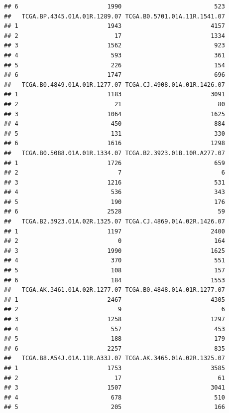 \documentclass[
]{article}
\begin{document}
\begin{verbatim}
## 6                         1990                          523
##   TCGA.BP.4345.01A.01R.1289.07 TCGA.B0.5701.01A.11R.1541.07
## 1                         1943                         4157
## 2                           17                         1334
## 3                         1562                          923
## 4                          593                          361
## 5                          226                          154
## 6                         1747                          696
##   TCGA.B0.4849.01A.01R.1277.07 TCGA.CJ.4908.01A.01R.1426.07
## 1                         1183                         3091
## 2                           21                           80
## 3                         1064                         1625
## 4                          450                          884
## 5                          131                          330
## 6                         1616                         1298
##   TCGA.B0.5088.01A.01R.1334.07 TCGA.B2.3923.01B.10R.A277.07
## 1                         1726                          659
## 2                            7                            6
## 3                         1216                          531
## 4                          536                          343
## 5                          190                          176
## 6                         2528                           59
##   TCGA.B2.3923.01A.02R.1325.07 TCGA.CJ.4869.01A.02R.1426.07
## 1                         1197                         2400
## 2                            0                          164
## 3                         1990                         1625
## 4                          370                          551
## 5                          108                          157
## 6                          184                         1553
##   TCGA.AK.3461.01A.02R.1277.07 TCGA.B0.4848.01A.01R.1277.07
## 1                         2467                         4305
## 2                            9                            6
## 3                         1258                         1297
## 4                          557                          453
## 5                          188                          179
## 6                         2257                          835
##   TCGA.B8.A54J.01A.11R.A33J.07 TCGA.AK.3465.01A.02R.1325.07
## 1                         1753                         3585
## 2                           17                           61
## 3                         1507                         3041
## 4                          678                          510
## 5                          205                          166

\end{verbatim}
\end{document}
